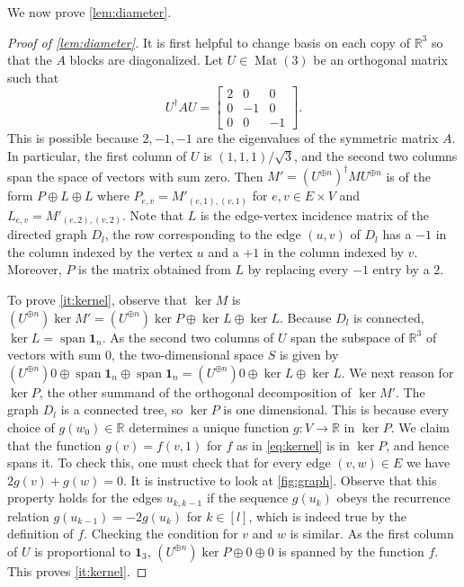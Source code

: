 \documentclass[10pt,a4paper]{article}
\numberwithin{equation}{section}
\DeclareMathOperator{\Mat}{Mat}
\DeclareMathOperator{\spn}{span}
\newcommand{\RR}{\mathbb R}
\newcommand{\id}{\mathbf{1}}
\begin{document}
 We now prove \cref{lem:diameter}.
 \begin{proof}[Proof of \cref{lem:diameter}] It is first helpful to change basis on each copy of $\RR^3$ so that the $A$ blocks are diagonalized. Let $U \in \Mat(3)$ be an orthogonal matrix such that 
$$U^\dagger A U =   \begin{bmatrix} 2 & 0 & 0 \\ 0 & -1 & 0 \\ 0 & 0 & -1 \end{bmatrix}.$$
This is possible because $2, -1, -1$ are the eigenvalues of the symmetric matrix $A$. In particular, the first column of $U$ is $(1,1,1)/\sqrt{3}$, and the second two columns span the space of vectors with sum zero. Then $M' = (U^{\oplus n})^\dagger M U^{\oplus n}$ is of the form $P \oplus L \oplus L$ where $P_{e,v} = M'_{(e, 1), (v, 1)}$ for $e, v \in E \times V$ and $L_{e, v} = M'_{(e, 2), (v, 2)}$.  Note that $L$ is the edge-vertex incidence matrix of the directed graph $D_l$, the row corresponding to the edge $(u,v)$ of $D_l$ has a $-1$ in the column indexed by the vertex $u$ and a $+1$ in the column indexed by $v$. Moreover, $P$ is the matrix obtained from $L$ by replacing every $-1$ entry by a $2$.

To prove \cref{it:kernel}, observe that $\ker M$ is $(U^{\oplus n}) \ker M' = (U^{\oplus n}) \ker P \oplus \ker L \oplus \ker L$. Because $D_l$ is connected, $\ker L = \spn \id_n$. As the second two columns of $U$ span the subspace of $\RR^3$ of vectors with sum $0$, the two-dimensional space $S$ is given by $(U^{\oplus n}) 0 \oplus \spn \id_n \oplus \spn \id_n = (U^{\oplus n}) 0 \oplus \ker L \oplus \ker L$. We next reason for $\ker P$, the other summand of the orthogonal decomposition of $\ker M'$. The graph $D_l$ is a connected tree, so $\ker P$ is one dimensional. This is because every choice of $g(w_0) \in \RR$ determines a unique function $g:V \to \RR$ in $\ker P$. We claim that the function $g(v) = f(v,1)$ for $f$ as in \cref{eq:kernel} is in $\ker P$, and hence spans it. To check this, one must check that for every edge $(v,w) \in E$ we have $2g(v) + g(w) = 0$. It is instructive to look at \cref{fig:graph}. Observe that this property holds for the edges $u_{k, k-1}$ if the sequence $g(u_k)$ obeys the recurrence relation $g(u_{k-1}) = -2g(u_k)$ for $k \in [l]$, which is indeed true by the definition of $f$. Checking the condition for $v$ and $w$ is similar. As the first column of $U$ is proportional to $\id_3$, $(U^{\oplus n}) \ker P \oplus 0 \oplus 0$ is spanned by the function $f$. This proves \cref{it:kernel}.


\end{proof}
\end{document}
